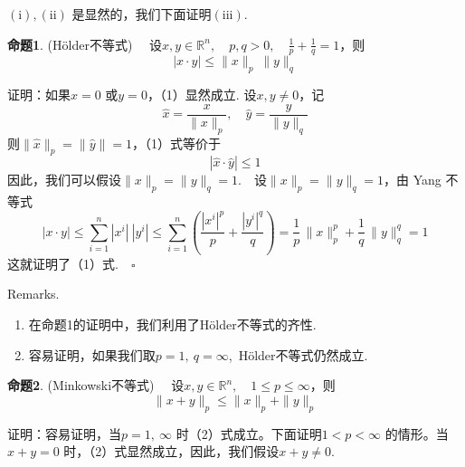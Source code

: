 \documentclass{article}
\begin{document}
\vspace{20pt}

\((\mathrm{i}),(\mathrm{ii})\) 是显然的，我们下面证明\((\mathrm{iii})\).

\newpage

\noindent \textbf{命题1}. (H\"older不等式) \ \ 设\(x, y \in \mathbb{R}^n,\quad p, q > 0,\quad \frac{1}{p} + \frac{1}{q} = 1 \)，则
\begin{equation}
    | x \cdot y | \le \|x\|_p\ \|y\|_q
\end{equation}

\noindent 证明：如果\(x = 0\) 或\(y = 0\)，（1）显然成立. 设\(x, y \neq 0\)，记
\begin{equation*}
    \hat{x} = \frac{x}{\|x\|_p},\quad \hat{y} = \frac{y}{\|y\|_q}
\end{equation*}
则\(\|\hat{x}\|_p =\|\hat{y}\|= 1 \)，（1）式等价于
\begin{equation*}
    | \hat{x} \cdot \hat{y} | \le 1
\end{equation*}
因此，我们可以假设\(\|x\|_p =\|y\|_q = 1\).\ \ 设\(\|x\|_p =\|y\|_q = 1\)，由 Yang 不等式
\begin{equation*}
    | x \cdot y | \le \sum_{i=1}^n | x^i |\ | y^i | \le \sum_{i=1}^n \left(\frac{ | x^i |^p }{p} + \frac{ | y^i |^q }{q}\right) = \frac{1}{p}\,\|x\|_p^p +\frac{1}{q}\,\|y\|_q^q = 1
\end{equation*}
这就证明了（1）式.\(\quad \square\)

\vspace{20pt}

Remarks.
\begin{enumerate}
    \item 在命题1的证明中，我们利用了H\"older不等式的齐性.
    \item 容易证明，如果我们取\(p = 1,\ q = \infty \),\ H\"older不等式仍然成立.
\end{enumerate}

\newpage

\noindent \textbf{命题2}. (Minkowski不等式) \ \ 设\(x,y \in \mathbb{R}^n,\quad 1 \le p \le \infty \)，则
\begin{equation}
    \|x + y\|_p \le \|x\|_p +\|y\|_p
\end{equation}

\vspace{20pt}

\noindent 证明：容易证明，当\(p = 1,\ \infty \) 时（2）式成立。下面证明\(1 < p < \infty \) 的情形。当\(x + y = 0\) 时，（2）式显然成立，因此，我们假设\(x + y \neq 0\).
\end{document}
